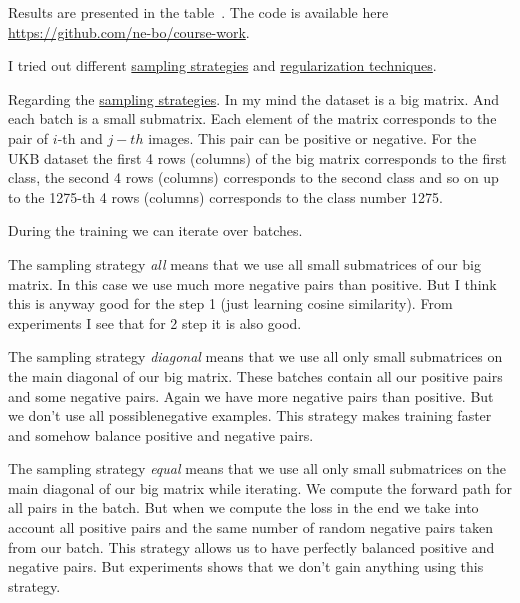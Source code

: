 \documentclass[10pt,a4paper]{article}
\begin{document}
    Results are presented in the table~.
    The code is available here \url{https://github.com/ne-bo/course-work}.
    \newline

    I tried out different \underline{sampling strategies} and \underline{regularization techniques}.
    \newline

    Regarding the \underline{sampling strategies}. In my mind the dataset is a big matrix. And each batch is a small submatrix.
    Each element of the matrix corresponds to the pair of $i$-th and $j-th$ images. This pair can be positive or negative.
    For the UKB dataset the first 4 rows (columns) of the big matrix corresponds to the first class, the second 4 rows (columns)
    corresponds to the second class and so on up to the 1275-th 4 rows (columns) corresponds to the class number 1275.
    \newline

    During the training we can iterate over batches.
    \newline

    The sampling strategy \textit{all} means that we use all small submatrices of our big matrix. In this case we use
    much more negative pairs than positive. But I think this is anyway good for the step 1 (just learning cosine similarity).
    From experiments I see that for 2 step it is also good.
    \newline

    The sampling strategy \textit{diagonal} means that we use all only small submatrices on the main diagonal of our big matrix.
    These batches contain all our positive pairs and some negative pairs. Again we have more negative pairs than positive.
    But we don't use all possiblenegative examples. This strategy makes training faster and somehow balance positive and negative pairs.
    \newline

    The sampling strategy \textit{equal} means that we use all only small submatrices on the main diagonal of our big matrix while iterating.
    We compute the forward path for all pairs in the batch. But when we compute the loss in the end we take into account all positive pairs
    and the same number of random negative pairs taken from our batch. This strategy allows us to have perfectly balanced positive and negative pairs.
    But experiments shows that we don't gain anything using this strategy.
    \newline
\end{document}
